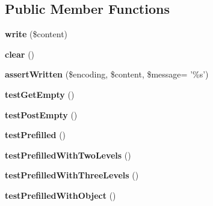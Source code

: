 \subsection*{Public Member Functions}
\begin{DoxyCompactItemize}
\item 
\hypertarget{class_test_of_encoding_acc873b976dcd81d6e45d3de332fea59f}{
{\bfseries write} (\$content)}
\label{class_test_of_encoding_acc873b976dcd81d6e45d3de332fea59f}

\item 
\hypertarget{class_test_of_encoding_aa0a31eb68b8f7562f48cba9b7ce4667a}{
{\bfseries clear} ()}
\label{class_test_of_encoding_aa0a31eb68b8f7562f48cba9b7ce4667a}

\item 
\hypertarget{class_test_of_encoding_a0838e91429eebe380f57b1042cad2a9a}{
{\bfseries assertWritten} (\$encoding, \$content, \$message= '\%s')}
\label{class_test_of_encoding_a0838e91429eebe380f57b1042cad2a9a}

\item 
\hypertarget{class_test_of_encoding_a9f66bceaa72a10a4f01eec58139f6196}{
{\bfseries testGetEmpty} ()}
\label{class_test_of_encoding_a9f66bceaa72a10a4f01eec58139f6196}

\item 
\hypertarget{class_test_of_encoding_a7de169d07d2bc7a9b1e308596a262729}{
{\bfseries testPostEmpty} ()}
\label{class_test_of_encoding_a7de169d07d2bc7a9b1e308596a262729}

\item 
\hypertarget{class_test_of_encoding_adf9237b8c4a6bbe6d93526ef80292814}{
{\bfseries testPrefilled} ()}
\label{class_test_of_encoding_adf9237b8c4a6bbe6d93526ef80292814}

\item 
\hypertarget{class_test_of_encoding_af4a7665f1276995c98100b01c8aaf3e8}{
{\bfseries testPrefilledWithTwoLevels} ()}
\label{class_test_of_encoding_af4a7665f1276995c98100b01c8aaf3e8}

\item 
\hypertarget{class_test_of_encoding_aede2eb7d50f2a8daefd5d5b236ad2746}{
{\bfseries testPrefilledWithThreeLevels} ()}
\label{class_test_of_encoding_aede2eb7d50f2a8daefd5d5b236ad2746}

\item 
\hypertarget{class_test_of_encoding_a1320d28ff3d1a04470e7bd1b19ed5ef8}{
{\bfseries testPrefilledWithObject} ()}
\label{class_test_of_encoding_a1320d28ff3d1a04470e7bd1b19ed5ef8}


\end{DoxyCompactItemize}
